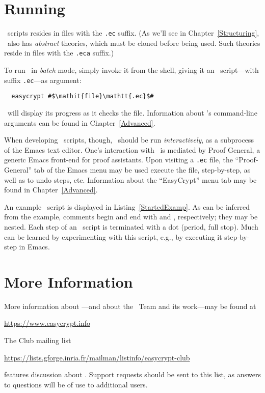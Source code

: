 \section{Running \EasyCrypt}

\EasyCrypt\ scripts resides in files with the \texttt{.ec} suffix. (As
we'll see in Chapter~\ref{Structuring}, \EasyCrypt\ also has
\emph{abstract} theories, which must be cloned before being used. Such
theories reside in files with the \texttt{.eca} suffix.)

To run
\EasyCrypt\ in \emph{batch} mode, simply invoke it from the shell,
giving it an \EasyCrypt\ script---with suffix \texttt{.ec}---as argument:
\begin{lstlisting}
  easycrypt #$\mathit{file}\mathtt{.ec}$#
\end{lstlisting}
\EasyCrypt\ will display its progress as it checks the file.
Information about \EasyCrypt's command-line arguments can be found
in Chapter~\ref{Advanced}.

When developing \EasyCrypt\ scripts, though, \EasyCrypt\ should be run
\emph{interactively}, as a subprocess of the Emacs text editor. One's
interaction with \EasyCrypt\ is mediated by Proof General, a generic
Emacs front-end for proof assistants.  Upon visiting a \texttt{.ec}
file, the ``Proof-General'' tab of the Emacs menu may be used execute
the file, step-by-step, as well as to undo steps, etc. Information
about the ``EasyCrypt'' menu tab may be found in
Chapter~\ref{Advanced}.

An example \EasyCrypt\ script is displayed in
Listing~\ref{StartedExamp}.
As can be inferred from the example, comments begin and end with
\ec{(*} and \ec{*)}, respectively; they may be nested. Each step of an
\EasyCrypt\ script is terminated with a dot (period, full stop).  Much
can be learned by experimenting with this script, e.g., by executing
it step-by-step in Emacs.

\section{More Information}

More information about \EasyCrypt---and about the \EasyCrypt\ Team
and its work---may be found at
\begin{center}
  \url{https://www.easycrypt.info}
\end{center}
The \EasyCrypt Club mailing list
\begin{center}
  \url{https://lists.gforge.inria.fr/mailman/listinfo/easycrypt-club}
\end{center}
features discussion about \EasyCrypt.
Support requests should be sent to this list, as answers to questions
will be of use to additional users.

